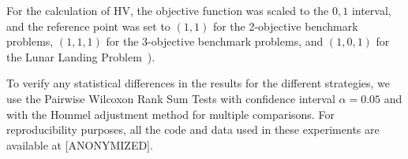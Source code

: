 For the calculation of HV, the objective function was scaled to the $0,1$ interval, and the reference point was set to $(1,1)$ for the 2-objective benchmark problems, $(1,1,1)$ for the 3-objective benchmark problems, and $(1,0,1)$ for the Lunar Landing Problem~\cite{Competition2018}).

To verify any statistical differences in the results for the different strategies, we use the Pairwise Wilcoxon Rank Sum Tests with confidence interval $\alpha = 0.05$ and with the Hommel adjustment method for multiple comparisons. For reproducibility purposes, all the code and data used in these experiments are available at [ANONYMIZED].
